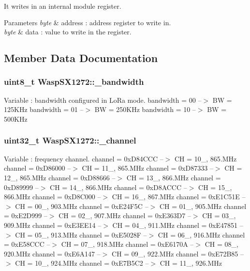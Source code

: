 It writes in an internal module register. 


\begin{DoxyParams}{Parameters}
{\em byte} & address \+: address register to write in. \\
\hline
{\em byte} & data \+: value to write in the register. \\
\hline
\end{DoxyParams}


\subsection{Member Data Documentation}
\subsubsection[{\texorpdfstring{\+\_\+bandwidth}{_bandwidth}}]{\setlength{\rightskip}{0pt plus 5cm}uint8\+\_\+t Wasp\+S\+X1272\+::\+\_\+bandwidth}\hypertarget{class_wasp_s_x1272_a00d80addbd1a513a8f6ae9706ac86083}{}\label{class_wasp_s_x1272_a00d80addbd1a513a8f6ae9706ac86083}
Variable \+: bandwidth configured in Lo\+Ra mode. bandwidth = 00 --$>$ BW = 125\+K\+Hz bandwidth = 01 --$>$ BW = 250\+K\+Hz bandwidth = 10 --$>$ BW = 500\+K\+Hz 
\subsubsection[{\texorpdfstring{\+\_\+channel}{_channel}}]{\setlength{\rightskip}{0pt plus 5cm}uint32\+\_\+t Wasp\+S\+X1272\+::\+\_\+channel}\hypertarget{class_wasp_s_x1272_a83eb4b1eb13e02e27186eab0c01f7067}{}\label{class_wasp_s_x1272_a83eb4b1eb13e02e27186eab0c01f7067}
Variable \+: frequency channel. channel = 0x\+D84\+C\+CC --$>$ CH = 10\+\_, 865.\+M\+Hz channel = 0x\+D86000 --$>$ CH = 11\+\_, 865.\+M\+Hz channel = 0x\+D87333 --$>$ CH = 12\+\_, 865.\+M\+Hz channel = 0x\+D88666 --$>$ CH = 13\+\_, 866.\+M\+Hz channel = 0x\+D89999 --$>$ CH = 14\+\_, 866.\+M\+Hz channel = 0x\+D8\+A\+C\+CC --$>$ CH = 15\+\_, 866.\+M\+Hz channel = 0x\+D8\+C000 --$>$ CH = 16\+\_, 867.\+M\+Hz channel = 0x\+E1\+C51E --$>$ CH = 00\+\_, 903.\+M\+Hz channel = 0x\+E24\+F5C --$>$ CH = 01\+\_, 905.\+M\+Hz channel = 0x\+E2\+D999 --$>$ CH = 02\+\_, 907.\+M\+Hz channel = 0x\+E363\+D7 --$>$ CH = 03\+\_, 909.\+M\+Hz channel = 0x\+E3\+E\+E14 --$>$ CH = 04\+\_, 911.\+M\+Hz channel = 0x\+E47851 --$>$ CH = 05\+\_, 913.\+M\+Hz channel = 0x\+E5028F --$>$ CH = 06\+\_, 916.\+M\+Hz channel = 0x\+E58\+C\+CC --$>$ CH = 07\+\_, 918.\+M\+Hz channel = 0x\+E6170A --$>$ CH = 08\+\_, 920.\+M\+Hz channel = 0x\+E6\+A147 --$>$ CH = 09\+\_, 922.\+M\+Hz channel = 0x\+E72\+B85 --$>$ CH = 10\+\_, 924.\+M\+Hz channel = 0x\+E7\+B5\+C2 --$>$ CH = 11\+\_, 926.\+M\+Hz 
